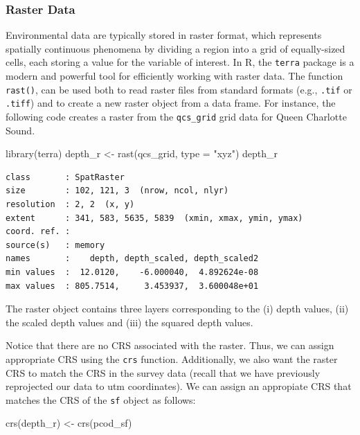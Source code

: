 \documentclass[
  letterpaper,
  DIV=11,
  numbers=noendperiod]{scrartcl}
\newenvironment{Shaded}{\begin{snugshade}}{\end{snugshade}}
\newcommand{\AttributeTok}[1]{\textcolor[rgb]{0.40,0.45,0.13}{#1}}
\newcommand{\FunctionTok}[1]{\textcolor[rgb]{0.28,0.35,0.67}{#1}}
\newcommand{\NormalTok}[1]{\textcolor[rgb]{0.00,0.23,0.31}{#1}}
\newcommand{\OtherTok}[1]{\textcolor[rgb]{0.00,0.23,0.31}{#1}}
\newcommand{\StringTok}[1]{\textcolor[rgb]{0.13,0.47,0.30}{#1}}
\begin{document}
\subsubsection{Raster Data}\label{raster-data}

Environmental data are typically stored in raster format, which
represents spatially continuous phenomena by dividing a region into a
grid of equally-sized cells, each storing a value for the variable of
interest. In R, the \texttt{terra} package is a modern and powerful tool
for efficiently working with raster data. The function \texttt{rast()},
can be used both to read raster files from standard formats (e.g.,
\texttt{.tif} or \texttt{.tiff}) and to create a new raster object from
a data frame. For instance, the following code creates a raster from the
\texttt{qcs\_grid} grid data for Queen Charlotte Sound.

\begin{Shaded}
\begin{Highlighting}[]
\FunctionTok{library}\NormalTok{(terra)}
\NormalTok{depth\_r }\OtherTok{\textless{}{-}} \FunctionTok{rast}\NormalTok{(qcs\_grid, }\AttributeTok{type =} \StringTok{"xyz"}\NormalTok{)}
\NormalTok{depth\_r}
\end{Highlighting}
\end{Shaded}

\begin{verbatim}
class       : SpatRaster 
size        : 102, 121, 3  (nrow, ncol, nlyr)
resolution  : 2, 2  (x, y)
extent      : 341, 583, 5635, 5839  (xmin, xmax, ymin, ymax)
coord. ref. :  
source(s)   : memory
names       :    depth, depth_scaled, depth_scaled2 
min values  :  12.0120,    -6.000040,  4.892624e-08 
max values  : 805.7514,     3.453937,  3.600048e+01 
\end{verbatim}

The raster object contains three layers corresponding to the (i) depth
values, (ii) the scaled depth values and (iii) the squared depth values.

Notice that there are no CRS associated with the raster. Thus, we can
assign appropriate CRS using the \texttt{crs} function. Additionally, we
also want the raster CRS to match the CRS in the survey data (recall
that we have previously reprojected our data to utm coordinates). We can
assign an appropiate CRS that matches the CRS of the \texttt{sf} object
as follows:

\begin{Shaded}
\begin{Highlighting}[]
\FunctionTok{crs}\NormalTok{(depth\_r) }\OtherTok{\textless{}{-}} \FunctionTok{crs}\NormalTok{(pcod\_sf)}
\end{Highlighting}
\end{Shaded}
\end{document}
